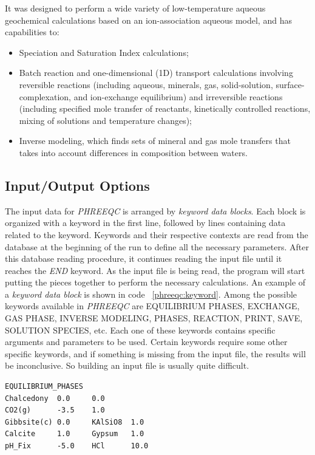 It was designed to perform a wide variety of low-temperature aqueous geochemical calculations based on an ion-association aqueous model, and has capabilities to:
\begin{itemize}
\item Speciation and Saturation Index calculations;
\item Batch reaction and one-dimensional (1D) transport calculations involving reversible reactions (including aqueous, minerals, gas, solid-solution, surface-complexation, and ion-exchange equilibrium) and irreversible reactions (including specified mole transfer of reactants, kinetically controlled reactions, mixing of solutions and temperature changes);
\item Inverse modeling, which finds sets of mineral and gas mole transfers that takes into account differences in composition between waters.
\end{itemize}

\subsection{Input/Output Options}
The input data for \emph{PHREEQC} is arranged by \emph{keyword data blocks}. Each block is organized with a keyword in the first line, followed by lines containing data related to the keyword. Keywords and their respective contexts are read from the database at the beginning of the run to define all the necessary parameters. After this database reading procedure, it continues reading the input file until it reaches the \emph{END} keyword. As the input file is being read, the program will start putting the pieces together to perform the necessary calculations. An example of a \emph{keyword data block} is shown in code ~\ref{phreeqc:keyword}. Among the possible keywords available in \emph{PHREEQC} are EQUILIBRIUM PHASES, EXCHANGE, GAS PHASE, INVERSE MODELING, PHASES, REACTION, PRINT, SAVE, SOLUTION SPECIES, etc. Each one of these keywords contains specific arguments and parameters to be used. Certain keywords require some other specific keywords, and if something is missing from the input file, the results will be inconclusive. So building an input file is usually quite difficult. 

\begin{minipage}[c]{0.92\textwidth}
\begin{lstlisting}[frame=single, caption=\emph{PHREEQC} keyword data block example, label=phreeqc:keyword]
EQUILIBRIUM_PHASES
Chalcedony  0.0     0.0
CO2(g)      -3.5    1.0
Gibbsite(c) 0.0     KAlSiO8  1.0
Calcite     1.0     Gypsum   1.0
pH_Fix      -5.0    HCl      10.0
\end{lstlisting}
\end{minipage}

